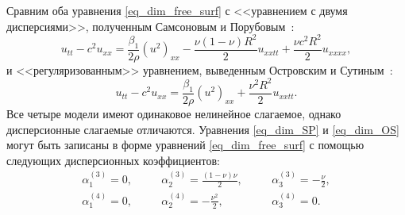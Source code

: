 \documentclass[12pt, a4paper]{report}
\begin{document}
Сравним оба уравнения \eqref{eq_dim_free_surf} с <<уравнением с двумя дисперсиями>>, полученным Самсоновым и Порубовым~\cite{SP}:
\begin{equation}\label{eq_dim_SP}
u_{tt} - c^2 u_{xx} =  \frac{\beta_1}{2 \rho} (u^2)_{xx} - \frac{\nu (1-\nu) R^2}{2} u_{xxtt} + \frac{\nu c^2 R^2}{2} u_{xxxx},
\end{equation}
и <<регуляризованным>> уравнением, выведенным Островским и Сутиным~\cite{OS}:
\begin{equation}\label{eq_dim_OS}
u_{tt} - c^2 u_{xx} =  \frac{\beta_1}{2 \rho} (u^2)_{xx} + \frac{\nu^2 R^2}{2} u_{xxtt}.
\end{equation}
Все четыре модели имеют одинаковое нелинейное слагаемое, однако дисперсионные слагаемые отличаются. Уравнения \eqref{eq_dim_SP} и \eqref{eq_dim_OS} могут быть записаны в форме уравнений \eqref{eq_dim_free_surf} с помощью следующих дисперсионных коэффициентов:
\begin{align} \nonumber
&\alpha_1^{(3)} = 0,&\quad &\alpha_2^{(3)} = \frac{(1-\nu)\nu}{2},& \quad &\alpha_3^{(3)} = -\frac \nu 2,&\\
\nonumber
&\alpha_1^{(4)} = 0,&\quad &\alpha_2^{(4)} = -\frac{\nu^2}{2},& \quad &\alpha_3^{(4)} = 0.&
\end{align}
\end{document}
